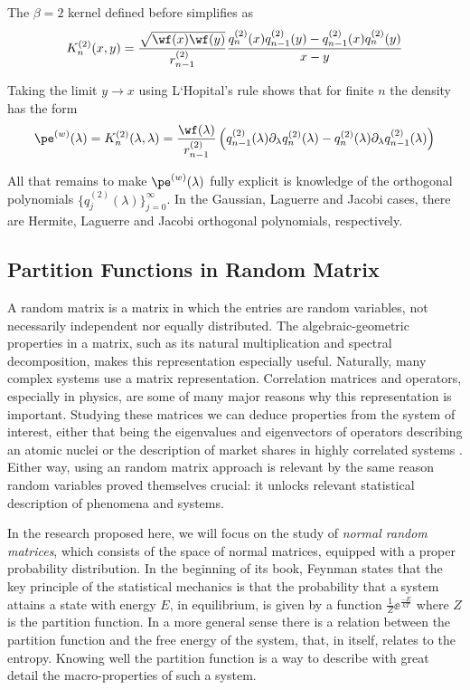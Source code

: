 \begin{prop}
	The $\beta=2$ kernel defined before simplifies as
	\begin{equation}
		K_n^{(2)}(x,y) = \frac{\sqrt{\wf(x) \wf(y)}}{r_{n-1}^{(2)}} \frac{q_n^{(2)}(x)q_{n-1}^{(2)}(y) - q_{n-1}^{(2)}(x)q_n^{(2)}(y)}{x-y}
	\end{equation}
	\label{Proposition: Kernel Simplification beta 2}
\end{prop}
Taking the limit $y \rightarrow x$ using L`Hopital's rule shows that for finite $n$ the density has the form
\begin{equation}
	\pe^{(w)}(\lambda) = K_n^{(2)}(\lambda, \lambda) = \frac{\wf(\lambda)}{r_{n-1}^{(2)}} \left( q_{n-1}^{(2)}(\lambda)\partial_\lambda q_{n}^{(2)}(\lambda) - q_{n}^{(2)}(\lambda)\partial_\lambda q_{n-1}^{(2)}(\lambda)  \right)
	\label{Equation: Equilibrium Measure and Kernel}
\end{equation}

All that remains to make $\pe^{(w)}(\lambda)$ fully explicit is knowledge of the orthogonal polynomials $\{q_j^{(2)}(\lambda)\}_{j=0}^\infty$. In the Gaussian, Laguerre and Jacobi cases, there are Hermite, Laguerre and Jacobi orthogonal polynomials, respectively.

\subsection{Partition Functions in Random Matrix} 

A random matrix is a matrix in which the entries are random variables, not necessarily independent nor equally distributed. The algebraic-geometric properties in a matrix, such as its natural multiplication and spectral decomposition, makes this representation especially useful. Naturally, many complex systems use a matrix representation. Correlation matrices and operators, especially in physics, are some of many major reasons why this representation is important. Studying these matrices we can deduce properties from the system of interest, either that being the eigenvalues and eigenvectors of operators describing an atomic nuclei \cite{Dyson} or the description of market shares in highly correlated systems \cite[Chapter~2]{fabozziquantitative}. Either way, using an random matrix approach is relevant by the same reason random variables proved themselves crucial: it unlocks relevant statistical description of phenomena and systems.

In the research proposed here, we will focus on the study of {\it normal random matrices}, which consists of the space of normal matrices, equipped with a proper probability distribution. In the beginning of its book, Feynman states \cite{feynmanstatistical} that the key principle of the statistical mechanics is that the probability that a system attains a state with energy $E$, in equilibrium, is given by a function $\frac{1}{Z} \ee^{\frac{-E}{kT}}$ where $Z$ is the partition function. In a more general sense there is a relation between the partition function and the free energy of the system, that, in itself, relates to the entropy. Knowing well the partition function is a way to describe with great detail the macro-properties of such a system.

